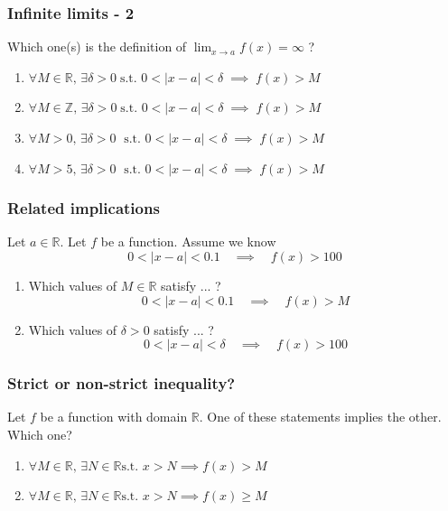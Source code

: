 \begin{frame}[t]
	\frametitle{Infinite limits - 2}

	Which one(s) is the definition of $\displaystyle \lim_{x \to a}f(x) = \infty$ ?
	\vfill
	\begin{enumerate}
		\item $\displaystyle \forall M \in \mathbb{R}, \, \exists \delta > 0 \; \text{
			s.t. }0 < |x-a|<\delta \; \implies \; f(x) > M$
			\vfill

		\item $\displaystyle \forall M \in \mathbb{Z}, \, \exists \delta > 0 \; \text{
			s.t. }0 < |x-a|<\delta \; \implies \; f(x) > M$
			\vfill

		\item $\displaystyle \forall M > 0, \, \exists \delta > 0 \; \text{ s.t. }0 <
			|x-a|<\delta \; \implies \; f(x) > M$
			\vfill

		\item $\displaystyle \forall M > 5, \, \exists \delta > 0 \; \text{ s.t. }0 <
			|x-a|<\delta \; \implies \; f(x) > M$
			\vfill

	\end{enumerate}
\end{frame}

\begin{frame}[t]
	\frametitle{Related implications}

	Let $a \in \mathbb{R}$. Let $f$ be a function. Assume we know
	\[
		0 < |x-a| < 0.1 \quad \implies \quad f(x) > 100
	\]
	\vspace{-.5cm}
	\begin{enumerate}
		\item Which values of $M \in \mathbb{R}$ satisfy ... ?
			\[
				0 < |x-a| < 0.1 \quad \implies \quad f(x) > M
			\]
			\vspace{-.5cm}

		\item Which values of $\delta>0$ satisfy ... ?
			\[
				0 < |x-a| < \delta \quad \implies \quad f(x) > 100
			\]
	\end{enumerate}
\end{frame}

\begin{frame}
	\frametitle{Strict or non-strict inequality?}

	Let $f$ be a function with domain $\mathbb{R}$. One of these statements implies
	the other. Which one?

	\begin{enumerate}
		\item $\displaystyle \forall M \in \mathbb{R}, \, \exists N \in \mathbb{R}\text{
			s.t. }x>N \implies f(x) > M$

		\item $\displaystyle \forall M \in \mathbb{R}, \, \exists N \in \mathbb{R}\text{
			s.t. }x>N \implies f(x) \geq M$
	\end{enumerate}
\end{frame}

